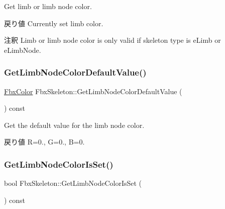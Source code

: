 Get limb or limb node color. \begin{DoxyReturn}{戻り値}
Currently set limb color. 
\end{DoxyReturn}
\begin{DoxyRemark}{注釈}
Limb or limb node color is only valid if skeleton type is {\ttfamily e\+Limb} or {\ttfamily e\+Limb\+Node}. 
\end{DoxyRemark}
\mbox{\label{class_fbx_skeleton_a3d19bee1e36bc2d7285751c3cf62e9b7}} 
\subsubsection{\texorpdfstring{Get\+Limb\+Node\+Color\+Default\+Value()}{GetLimbNodeColorDefaultValue()}}
{\footnotesize\ttfamily \hyperlink{class_fbx_color}{Fbx\+Color} Fbx\+Skeleton\+::\+Get\+Limb\+Node\+Color\+Default\+Value (\begin{DoxyParamCaption}{ }\end{DoxyParamCaption}) const}

Get the default value for the limb node color. \begin{DoxyReturn}{戻り値}
R=0., G=0., B=0. 
\end{DoxyReturn}
\mbox{\label{class_fbx_skeleton_aebddf26b8d688674a4122c7853419b62}} 
\subsubsection{\texorpdfstring{Get\+Limb\+Node\+Color\+Is\+Set()}{GetLimbNodeColorIsSet()}}
{\footnotesize\ttfamily bool Fbx\+Skeleton\+::\+Get\+Limb\+Node\+Color\+Is\+Set (\begin{DoxyParamCaption}{ }\end{DoxyParamCaption}) const}

